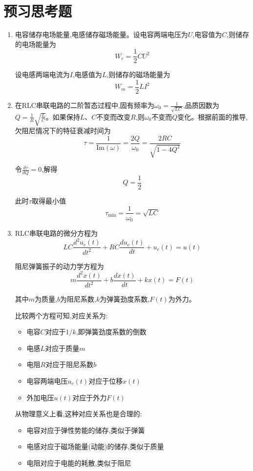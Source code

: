 \documentclass[UTF8]{ctexart}
\begin{document}
\section{预习思考题}

\begin{enumerate}
\item 电容储存电场能量,电感储存磁场能量。设电容两端电压为$U$,电容值为$C$,则储存的电场能量为
\begin{equation}
W_e=\frac{1}{2}CU^2
\end{equation}

设电感两端电流为$I$,电感值为$L$,则储存的磁场能量为
\begin{equation}
W_m=\frac{1}{2}LI^2
\end{equation}

\item 在RLC串联电路的二阶暂态过程中,固有频率为$\omega_0=\frac{1}{\sqrt{LC}}$,品质因数为$Q=\frac{1}{R}\sqrt{\frac{L}{C}}$。如果保持$L$、$C$不变而改变$R$,则$\omega_0$不变而$Q$变化。根据前面的推导,欠阻尼情况下的特征衰减时间为
\begin{equation}
\tau=\frac{1}{\text{Im}(\omega)}=\frac{2Q}{\omega_0}=\frac{2RC}{\sqrt{1-4Q^2}}
\end{equation}

令$\frac{d\tau}{dQ}=0$,解得
\begin{equation}
Q=\frac{1}{2}
\end{equation}

此时$\tau$取得最小值
\begin{equation}
\tau_{\min}=\frac{1}{\omega_0}=\sqrt{LC}
\end{equation}

\item RLC串联电路的微分方程为
\begin{equation}
LC\frac{d^2u_c(t)}{dt^2}+RC\frac{du_c(t)}{dt}+u_c(t)=u(t)
\end{equation}

阻尼弹簧振子的动力学方程为
\begin{equation}
m\frac{d^2x(t)}{dt^2}+b\frac{dx(t)}{dt}+kx(t)=F(t)
\end{equation}

其中$m$为质量,$b$为阻尼系数,$k$为弹簧劲度系数,$F(t)$为外力。

比较两个方程可知,对应关系为:
\begin{itemize}
\item 电容$C$对应于$1/k$,即弹簧劲度系数的倒数
\item 电感$L$对应于质量$m$
\item 电阻$R$对应于阻尼系数$b$
\item 电容两端电压$u_c(t)$对应于位移$x(t)$
\item 外加电压$u(t)$对应于外力$F(t)$
\end{itemize}

从物理意义上看,这种对应关系也是合理的:
\begin{itemize}
\item 电容对应于弹性势能的储存,类似于弹簧
\item 电感对应于磁场能量(动能)的储存,类似于质量
\item 电阻对应于电能的耗散,类似于阻尼
\end{itemize}
\end{enumerate}
\end{document}
